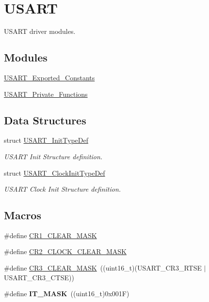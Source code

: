 \hypertarget{group___u_s_a_r_t}{\section{U\-S\-A\-R\-T}
\label{group___u_s_a_r_t}
}


U\-S\-A\-R\-T driver modules.  


\subsection*{Modules}
\begin{DoxyCompactItemize}
\item 
\hyperlink{group___u_s_a_r_t___exported___constants}{U\-S\-A\-R\-T\-\_\-\-Exported\-\_\-\-Constants}
\item 
\hyperlink{group___u_s_a_r_t___private___functions}{U\-S\-A\-R\-T\-\_\-\-Private\-\_\-\-Functions}
\end{DoxyCompactItemize}
\subsection*{Data Structures}
\begin{DoxyCompactItemize}
\item 
struct \hyperlink{struct_u_s_a_r_t___init_type_def}{U\-S\-A\-R\-T\-\_\-\-Init\-Type\-Def}
\begin{DoxyCompactList}\small\item\em U\-S\-A\-R\-T Init Structure definition. \end{DoxyCompactList}\item 
struct \hyperlink{struct_u_s_a_r_t___clock_init_type_def}{U\-S\-A\-R\-T\-\_\-\-Clock\-Init\-Type\-Def}
\begin{DoxyCompactList}\small\item\em U\-S\-A\-R\-T Clock Init Structure definition. \end{DoxyCompactList}\end{DoxyCompactItemize}
\subsection*{Macros}
\begin{DoxyCompactItemize}
\item 
\#define \hyperlink{group___u_s_a_r_t_ga8d425258898b4af4ebc820f52635fad8}{C\-R1\-\_\-\-C\-L\-E\-A\-R\-\_\-\-M\-A\-S\-K}
\item 
\#define \hyperlink{group___u_s_a_r_t_ga7834b3d9be4875de242f87c12fd79f02}{C\-R2\-\_\-\-C\-L\-O\-C\-K\-\_\-\-C\-L\-E\-A\-R\-\_\-\-M\-A\-S\-K}
\item 
\#define \hyperlink{group___u_s_a_r_t_ga5c882571db73abc5d1837368a1cb0a64}{C\-R3\-\_\-\-C\-L\-E\-A\-R\-\_\-\-M\-A\-S\-K}~((uint16\-\_\-t)(U\-S\-A\-R\-T\-\_\-\-C\-R3\-\_\-\-R\-T\-S\-E $|$ U\-S\-A\-R\-T\-\_\-\-C\-R3\-\_\-\-C\-T\-S\-E))
\item 
\hypertarget{group___u_s_a_r_t_gacde7fc0e46b3a5fc7e2002b2915884d5}{\#define {\bfseries I\-T\-\_\-\-M\-A\-S\-K}~((uint16\-\_\-t)0x001\-F)}\label{group___u_s_a_r_t_gacde7fc0e46b3a5fc7e2002b2915884d5}

\end{DoxyCompactItemize}
